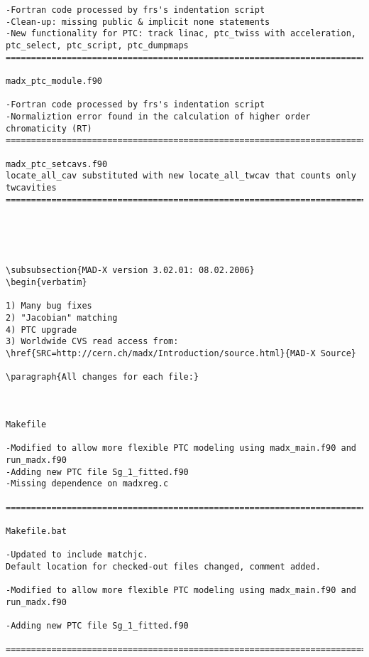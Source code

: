 \begin{verbatim}
-Fortran code processed by frs's indentation script
-Clean-up: missing public & implicit none statements
-New functionality for PTC: track linac, ptc_twiss with acceleration, 
ptc_select, ptc_script, ptc_dumpmaps
=============================================================================

madx_ptc_module.f90

-Fortran code processed by frs's indentation script
-Normaliztion error found in the calculation of higher order chromaticity (RT)
=============================================================================

madx_ptc_setcavs.f90
locate_all_cav substituted with new locate_all_twcav that counts only 
twcavities
=============================================================================





\subsubsection{MAD-X version 3.02.01: 08.02.2006}
\begin{verbatim}

1) Many bug fixes
2) "Jacobian" matching
4) PTC upgrade
3) Worldwide CVS read access from:
\href{SRC=http://cern.ch/madx/Introduction/source.html}{MAD-X Source}

\paragraph{All changes for each file:}



Makefile

-Modified to allow more flexible PTC modeling using madx_main.f90 and
run_madx.f90
-Adding new PTC file Sg_1_fitted.f90
-Missing dependence on madxreg.c

=============================================================================

Makefile.bat

-Updated to include matchjc.
Default location for checked-out files changed, comment added.

-Modified to allow more flexible PTC modeling using madx_main.f90 and
run_madx.f90

-Adding new PTC file Sg_1_fitted.f90

=============================================================================


\end{verbatim}

